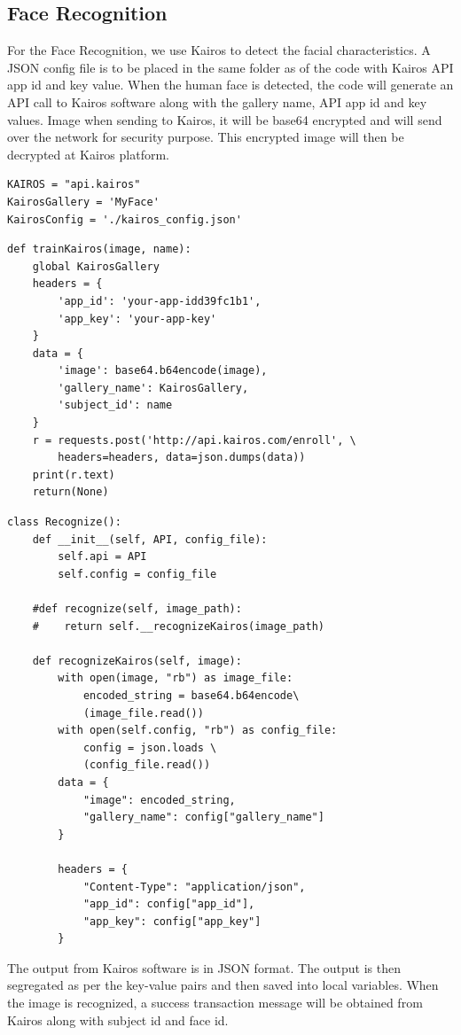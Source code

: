 \subsection{Face Recognition}
For the Face Recognition, we use Kairos to detect the facial characteristics. 
A JSON config file is to be placed in the same folder as of the code with 
Kairos API app id and key value. When the human face is detected, the code 
will generate an API call to Kairos software along with the gallery name, 
API app id and key values. Image when sending to Kairos, it will be base64 
encrypted and will send over the network for security purpose. This encrypted 
image will then be decrypted at Kairos platform.


\begin{verbatim}
KAIROS = "api.kairos"
KairosGallery = 'MyFace'
KairosConfig = './kairos_config.json'
\end{verbatim}

\begin{verbatim}
def trainKairos(image, name):
    global KairosGallery
    headers = {
        'app_id': 'your-app-idd39fc1b1',
        'app_key': 'your-app-key'
    }
    data = {
        'image': base64.b64encode(image),
        'gallery_name': KairosGallery,
        'subject_id': name
    }
    r = requests.post('http://api.kairos.com/enroll', \ 
        headers=headers, data=json.dumps(data))
    print(r.text)
    return(None)
\end{verbatim}

\begin{verbatim}
class Recognize():
    def __init__(self, API, config_file):
        self.api = API
        self.config = config_file

    #def recognize(self, image_path):
    #    return self.__recognizeKairos(image_path)
    
    def recognizeKairos(self, image):
        with open(image, "rb") as image_file:
            encoded_string = base64.b64encode\
            (image_file.read())
        with open(self.config, "rb") as config_file:
            config = json.loads \ 
            (config_file.read())
        data = {
            "image": encoded_string,
            "gallery_name": config["gallery_name"]
        }

        headers = {
            "Content-Type": "application/json",
            "app_id": config["app_id"],
            "app_key": config["app_key"]
        }
\end{verbatim}

The output from Kairos software is in JSON format. The output is then 
segregated as per the key-value pairs and then saved into local variables. 
When the image is recognized, a success transaction message will be 
obtained from Kairos along with subject id and face id.

